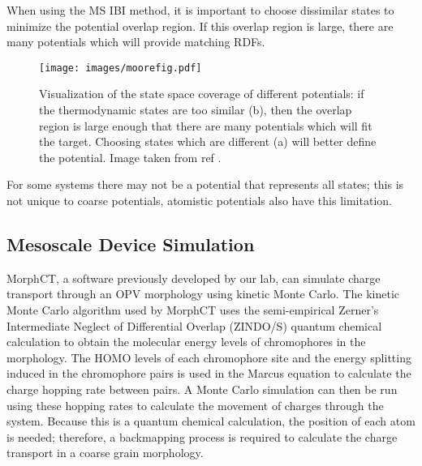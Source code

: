 When using the MS IBI method, it is important to choose dissimilar states to minimize the potential overlap region.
If this overlap region is large, there are many potentials which will provide matching RDFs.

\begin{wrapfigure}{L}{0.5\linewidth}
    \centering
    \texttt{[image: images/moorefig.pdf]}
    \caption{Visualization of the state space coverage of different potentials: if the thermodynamic states are too similar (b), then the overlap region is large enough that there are many potentials which will fit the target. Choosing states which are different (a) will better define the potential. Image taken from ref \cite{Moore2014}.}
    \label{fig:lj}
\end{wrapfigure}

For some systems there may not be a potential that represents all states; this is not unique to coarse potentials, atomistic potentials also have this limitation.

\subsection*{Mesoscale Device Simulation}

MorphCT, a software previously developed by our lab, can simulate charge transport through an OPV morphology using kinetic Monte Carlo\cite{Miller2018a,MorphCT,morphct2.2}.
The kinetic Monte Carlo algorithm used by MorphCT uses the semi-empirical Zerner's Intermediate Neglect of Differential Overlap (ZINDO/S) quantum chemical calculation to obtain the molecular energy levels of chromophores in the morphology.
The HOMO levels of each chromophore site and the energy splitting induced in the chromophore pairs is used in the Marcus equation to calculate the charge hopping rate between pairs.
A Monte Carlo simulation can then be run using these hopping rates to calculate the movement of charges through the system.
Because this is a quantum chemical calculation, the position of each atom is needed; therefore, a backmapping process is required to calculate the charge transport in a coarse grain morphology.

